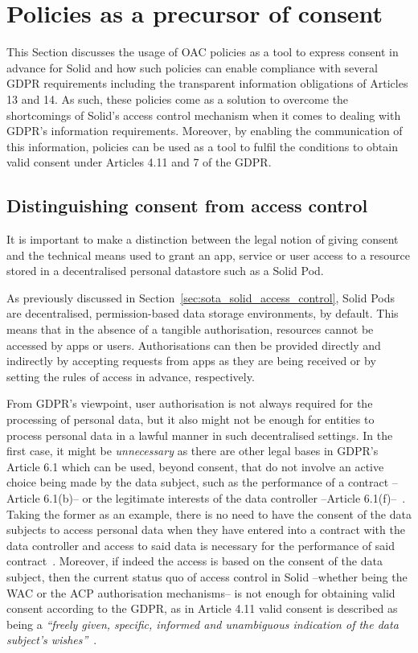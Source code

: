 \section{Policies as a precursor of consent}
\label{sec:policies_consent}

This Section discusses the usage of OAC policies as a tool to express consent in advance for Solid and how such policies can enable compliance with several GDPR requirements including the transparent information obligations of Articles 13 and 14.
As such, these policies come as a solution to overcome the shortcomings of Solid's access control mechanism when it comes to dealing with GDPR's information requirements.
Moreover, by enabling the communication of this information, policies can be used as a tool to fulfil the conditions to obtain valid consent under Articles 4.11 and 7 of the GDPR.

\subsection{Distinguishing consent from access control}
\label{sec:distinction}

It is important to make a distinction between the legal notion of giving consent and the technical means used to grant an app, service or user access to a resource stored in a decentralised personal datastore such as a Solid Pod.

As previously discussed in Section~\ref{sec:sota_solid_access_control}, Solid Pods are decentralised, permission-based data storage environments, by default.
This means that in the absence of a tangible authorisation, resources cannot be accessed by apps or users.
Authorisations can then be provided directly and indirectly by accepting requests from apps as they are being received or by setting the rules of access in advance, respectively.

From GDPR's viewpoint, user authorisation is not always required for the processing of personal data, but it also might not be enough for entities to process personal data in a lawful manner in such decentralised settings.
In the first case, it might be \textit{unnecessary} as there are other legal bases in GDPR's Article 6.1 which can be used, beyond consent, that do not involve an active choice being made by the data subject, such as the performance of a contract --Article 6.1(b)-- or the legitimate interests of the data controller --Article 6.1(f)--~\citep{kranenborg_article_2014}.
Taking the former as an example, there is no need to have the consent of the data subjects to access personal data when they have entered into a contract with the data controller and access to said data is necessary for the performance of said contract~\citep{european_data_protection_board_guidelines_2019}.
Moreover, if indeed the access is based on the consent of the data subject, then the current status quo of access control in Solid --whether being the WAC or the ACP authorisation mechanisms-- is not enough for obtaining valid consent according to the GDPR, as in Article 4.11 valid consent is described as being a \textit{``freely given, specific, informed and unambiguous indication of the data subject’s wishes''}~\citeyearpar{noauthor_regulation_2016}. 

